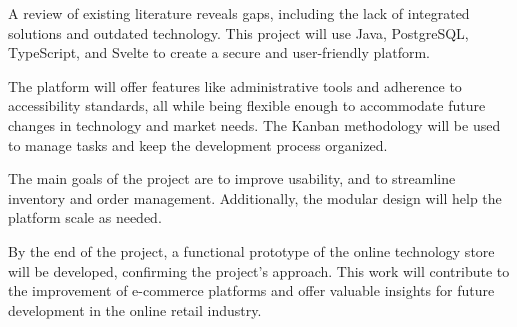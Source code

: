\documentclass[a4paper,journal]{IEEEtran}
\begin{document}
A review of
existing literature reveals gaps, including the lack of integrated solutions and
outdated technology.
This project will use Java, PostgreSQL, TypeScript, and Svelte
to create a secure and user-friendly platform.

The platform will offer features like
administrative tools and adherence to accessibility standards, all while being
flexible enough to accommodate future changes in technology and market needs.
The Kanban methodology will be used to manage tasks and keep the development
process organized.

The main goals of the project are to improve usability, and
to streamline inventory and order management.
Additionally, the modular design will help the platform scale as needed.

By the end of the project, a functional prototype of the online technology store
will be developed, confirming the project's approach. This work will contribute
to the improvement of e-commerce platforms and offer valuable insights for
future development in the online retail industry.


%
%

\end{document}
